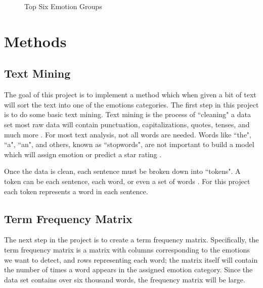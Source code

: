 \documentclass[titlepage,letterpaper]{article}
\begin{document}
 
% 
 \begin{figure}[htb]
 		\centering
 		\caption{Top Six Emotion Groups}
 		\resizebox{4in}{!}{}
 		\label{topsixgroups}
 \end{figure}
 	
 
\section{Methods}

\subsection{Text Mining}
The goal of this project is to implement a method which when given a bit of text will sort the text into one of the emotions categories. The first step in this project is to do some basic text mining. Text mining is the process of ``cleaning" a data set most raw data will contain punctuation, capitalizations, quotes, tenses, and much more \cite{TextMining}. For most text analysis, not all words are needed. Words like ``the", ``a", ``an", and others, known as ``stopwords", are not important to build a model which will assign emotion or predict a star rating \cite{TextMining}. 

Once the data is clean, each sentence must be broken down into ``tokens". A token can be each sentence, each word, or even a set of words \cite{TextMining}. For this project each token represents a word in each sentence. 

\subsection{Term Frequency Matrix}
The next step in the project is to create a term frequency matrix. Specifically, the term frequency matrix is a matrix with columns corresponding to the emotions we want to detect, and rows representing each word; the matrix itself will contain the number of times a word appears in the assigned emotion category. Since the data set contains over six thousand words, the frequency matrix will be large.
\end{document}
